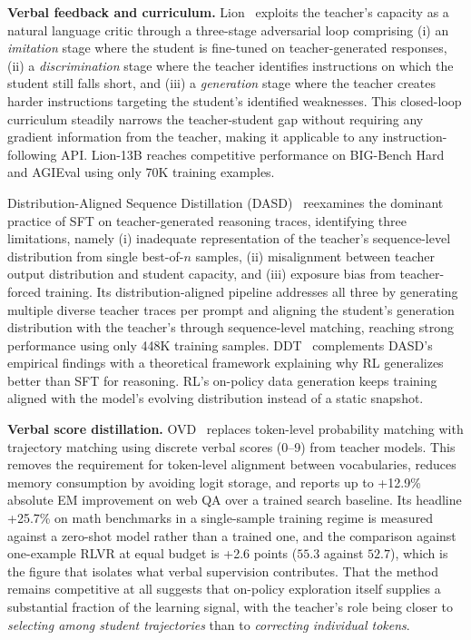 \documentclass{article} %
\begin{document}
\textbf{Verbal feedback and curriculum.} Lion~\citep{2305.12870} exploits the teacher's capacity as a natural language critic through a three-stage adversarial loop comprising (i) an \emph{imitation} stage where the student is fine-tuned on teacher-generated responses, (ii) a \emph{discrimination} stage where the teacher identifies instructions on which the student still falls short, and (iii) a \emph{generation} stage where the teacher creates harder instructions targeting the student's identified weaknesses. This closed-loop curriculum steadily narrows the teacher-student gap without requiring any gradient information from the teacher, making it applicable to any instruction-following API. Lion-13B reaches competitive performance on BIG-Bench Hard and AGIEval using only 70K training examples.

Distribution-Aligned Sequence Distillation (DASD)~\citep{2601.09088} reexamines the dominant practice of SFT on teacher-generated reasoning traces, identifying three limitations, namely (i) inadequate representation of the teacher's sequence-level distribution from single best-of-$n$ samples, (ii) misalignment between teacher output distribution and student capacity, and (iii) exposure bias from teacher-forced training. Its distribution-aligned pipeline addresses all three by generating multiple diverse teacher traces per prompt and aligning the student's generation distribution with the teacher's through sequence-level matching, reaching strong performance using only 448K training samples. DDT~\citep{2602.12222} complements DASD's empirical findings with a theoretical framework explaining why RL generalizes better than SFT for reasoning. RL's on-policy data generation keeps training aligned with the model's evolving distribution instead of a static snapshot.

\textbf{Verbal score distillation.} OVD~\citep{2601.21968} replaces token-level probability matching with trajectory matching using discrete verbal scores (0--9) from teacher models. This removes the requirement for token-level alignment between vocabularies, reduces memory consumption by avoiding logit storage, and reports up to +12.9\% absolute EM improvement on web QA over a trained search baseline. Its headline +25.7\% on math benchmarks in a single-sample training regime is measured against a zero-shot model rather than a trained one, and the comparison against one-example RLVR at equal budget is +2.6 points ($55.3$ against $52.7$), which is the figure that isolates what verbal supervision contributes. That the method remains competitive at all suggests that on-policy exploration itself supplies a substantial fraction of the learning signal, with the teacher's role being closer to \emph{selecting among student trajectories} than to \emph{correcting individual tokens}.
\end{document}
